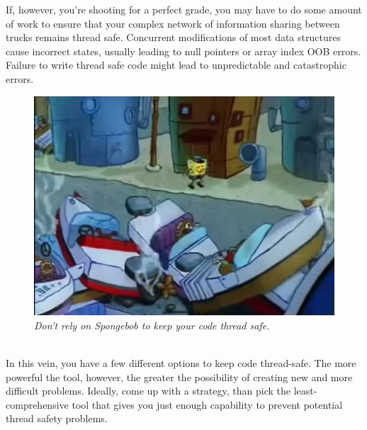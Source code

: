 \documentclass[11pt]{article}
\begin{document}
If, however, you're shooting for a perfect grade, you may have to do some amount
of work to ensure that your complex network of information sharing between
trucks remains thread safe. Concurrent modifications of most data structures
cause incorrect states, usually leading to null pointers or array index OOB
errors. Failure to write thread safe code might lead to unpredictable and
catastrophic errors.\\
\begin{figure}[h]
\centerline{\includegraphics[scale=0.65]{collision.png}} 
\caption{\em{Don't rely on Spongebob to keep your code thread safe.}}
\end{figure}
\\In this vein, you have a few different options to keep code thread-safe. The
more powerful the tool, however, the greater the possibility of creating new and
more difficult problems. Ideally, come up with a strategy, than pick the
least-comprehensive tool that gives you just enough capability to prevent
potential thread safety problems.
\end{document}
